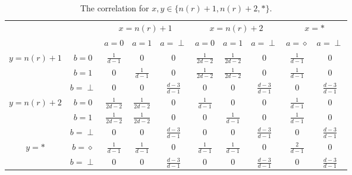 \documentclass[11pt,letterpaper]{article}
\newcommand{\1}{\mathbb{1}}
\newcommand{\nr}{n(r)}
\theoremstyle{definition}
\begin{document}
\begin{table}[H]
\begin{center}
\begin{tabular}{|c|c||c|c|c|c|c|c|c|c|}
\hline
\multicolumn{2}{|c|}{} &
\multicolumn{3}{|c|}{$x=\nr+1$}&
\multicolumn{3}{|c|}{$x=\nr+2$}&
\multicolumn{2}{|c|}{$x=\ast$}\\
\cline{3-10}
\multicolumn{2}{|c|}{} &
$a = 0$ & $a=1$ & $a=\perp$ &
$a = 0$ & $a=1$ & $a=\perp$ &
$a = \diamond$ & $a = \perp$\\
\hline
\hline
\multirow{3}{*}{$y = \nr+1$} & $b=0$ & $\frac{1}{d-1}$ & $0$ & 0 
& $\frac{1}{2d-2}$ & $\frac{1}{2d-2}$ & 0 & $\frac{1}{d-1}$ & 0 \\
\cline{2-10}
&$b=1$ & 0 & $\frac{1}{d-1}$ & $0$ 
&  $\frac{1}{2d-2}$ & $\frac{1}{2d-2}$ & 0 &$\frac{1}{d-1}$ & 0 \\
\cline{2-10}
&$b=\perp$ & 0 & 0 & $\frac{d-3}{d-1}$ 
&  0 & 0 &  $\frac{d-3}{d-1} $ &0 & $\frac{d-3}{d-1}$ \\
\hline
\multirow{3}{*}{$y = \nr+2$} & $b=0$ & $\frac{1}{2d-2}$ & $\frac{1}{2d-2}$ & 0 
& $\frac{1}{d-1}$ & $0$ & 0 & $\frac{1}{d-1}$ & 0 \\
\cline{2-10}
&$b=1$ & $\frac{1}{2d-2}$ & $\frac{1}{2d-2}$ & $0$ 
&  0 & $\frac{1}{d-1}$ & $0$ &$\frac{1}{d-1}$ & 0 \\
\cline{2-10}
&$b=\perp$ & 0 & 0 & \small $\frac{d-3}{d-1}$ 
&  0 & 0 & \small $\frac{d-3}{d-1} $ &0 &\small $\frac{d-3}{d-1}$ \\
\hline
\multirow{2}{*}{$y = \ast$} & $b=\diamond$ & $\frac{1}{d-1}$ & $\frac{1}{d-1}$ & 0 
& $\frac{1}{d-1}$ & $\frac{1}{d-1}$ & 0 & $\frac{2}{d-1}$ & 0 \\
\cline{2-10}
&$b=\perp$ & 0 & 0 & $\frac{d-3}{d-1}$ 
&  0 & 0 & \small $\frac{d-3}{d-1} $ &0 & \small $\frac{d-3}{d-1}$ \\
\hline
\end{tabular}
\end{center}
\caption{The correlation for $x ,y\in\{\nr+1,\nr+2, \ast\} $.}
\end{table}
\end{document}

